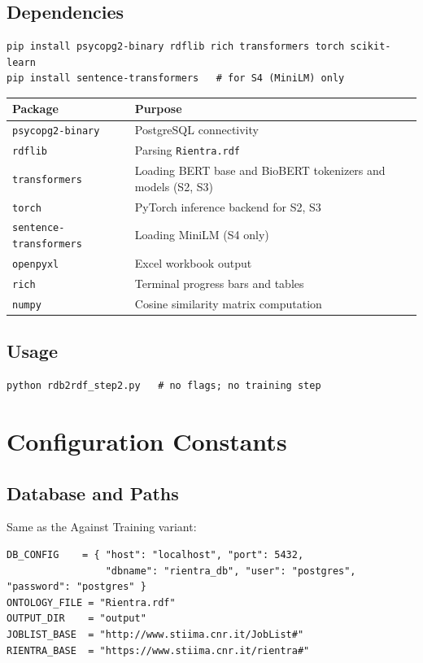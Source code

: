 ﻿\documentclass[12pt,a4paper]{article}
\begin{document}
\subsection{Dependencies}

\begin{lstlisting}
pip install psycopg2-binary rdflib rich transformers torch scikit-learn
pip install sentence-transformers   # for S4 (MiniLM) only
\end{lstlisting}

\begin{longtable}{@{}P{4cm}P{10.5cm}@{}}
\toprule
\textbf{Package} & \textbf{Purpose} \\
\midrule
\endhead
\texttt{psycopg2-binary} & PostgreSQL connectivity \\
\texttt{rdflib} & Parsing \texttt{Rientra.rdf} \\
\texttt{transformers} & Loading BERT base and BioBERT tokenizers and models (S2, S3) \\
\texttt{torch} & PyTorch inference backend for S2, S3 \\
\texttt{sentence-transformers} & Loading MiniLM (S4 only) \\
\texttt{openpyxl} & Excel workbook output \\
\texttt{rich} & Terminal progress bars and tables \\
\texttt{numpy} & Cosine similarity matrix computation \\
\bottomrule
\end{longtable}

\subsection{Usage}
\begin{lstlisting}
python rdb2rdf_step2.py   # no flags; no training step
\end{lstlisting}

\clearpage
\section{Configuration Constants}

\subsection{Database and Paths}

Same as the Against Training variant:
\begin{lstlisting}
DB_CONFIG    = { "host": "localhost", "port": 5432,
                 "dbname": "rientra_db", "user": "postgres", "password": "postgres" }
ONTOLOGY_FILE = "Rientra.rdf"
OUTPUT_DIR    = "output"
JOBLIST_BASE  = "http://www.stiima.cnr.it/JobList#"
RIENTRA_BASE  = "https://www.stiima.cnr.it/rientra#"
\end{lstlisting}
\end{document}

